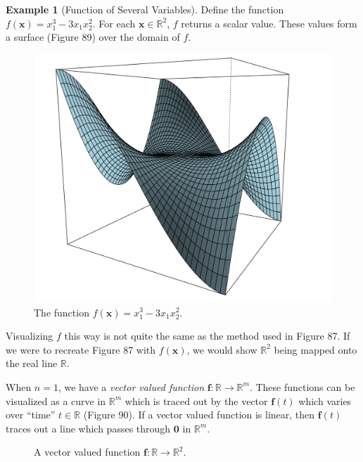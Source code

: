 \documentclass{article}
\newcommand{\R}{\mathbb{R}}
\newcommand{\x}{\mathbf{x}}
\newcommand{\f}{\mathbf{f}}
\newcommand{\ze}{\mathbf{0}}
\theoremstyle{definition}
\newtheorem{example}{Example}[section]
\begin{document}
	\begin{example}[Function of Several Variables]
		Define the function $ f(\x)=x_1^3 -3x_1x_2^2 $. For each $ \x\in\R^2 $, $ f $ returns a scalar value. These values form a surface (Figure 89) over the domain of $ f $. 
		\begin{figure}[h!]
			\centering
			\includegraphics[width=0.7\linewidth]{figures/monkey_saddle}
			\caption{The function $ f(\x)= x_1^3 -3x_1x_2^2 $.}
			\label{fig:monkeysaddle}
		\end{figure}
		Visualizing $ f $ this way is not quite the same as the method used in Figure 87. If we were to recreate Figure 87 with $ f(\x) $, we would show $ \R^2 $ being mapped onto the real line $ \R $. 
	\end{example}
	
	When $ n = 1 $, we have a \textit{\color{red}vector valued function} $ \f:\R\to\R^m$. These functions can be visualized as a curve in $ \R^m $ which is traced out by the vector $ \f(t) $ which varies over ``time'' $ t\in \R $ (Figure 90). If a vector valued function is linear, then $ \f(t) $ traces out a line which passes through $ \ze $ in $ \R^m $. 
	
	\begin{figure}[h]
		\caption{A vector valued function $ \f:\R\to\R^2 $.}
	\end{figure}
	
\end{document}
